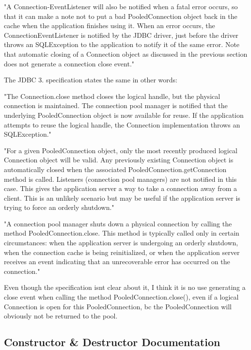"A Connection-\/\+Event\+Listener will also be notified when a fatal error occurs, so that it can make a note not to put a bad Pooled\+Connection object back in the cache when the application finishes using it. When an error occurs, the Connection\+Event\+Listener is notified by the J\+D\+BC driver, just before the driver throws an S\+Q\+L\+Exception to the application to notify it of the same error. Note that automatic closing of a Connection object as discussed in the previous section does not generate a connection close event." 

The J\+D\+BC 3. specification states the same in other words\+:

"The Connection.\+close method closes the logical handle, but the physical connection is maintained. The connection pool manager is notified that the underlying Pooled\+Connection object is now available for reuse. If the application attempts to reuse the logical handle, the Connection implementation throws an S\+Q\+L\+Exception." 

"For a given Pooled\+Connection object, only the most recently produced logical Connection object will be valid. Any previously existing Connection object is automatically closed when the associated Pooled\+Connection.\+get\+Connection method is called. Listeners (connection pool managers) are not notified in this case. This gives the application server a way to take a connection away from a client. This is an unlikely scenario but may be useful if the application server is trying to force an orderly shutdown." 

"A connection pool manager shuts down a physical connection by calling the method Pooled\+Connection.\+close. This method is typically called only in certain circumstances\+: when the application server is undergoing an orderly shutdown, when the connection cache is being reinitialized, or when the application server receives an event indicating that an unrecoverable error has occurred on the connection." 

Even though the specification isn\textquotesingle{}t clear about it, I think it is no use generating a close event when calling the method Pooled\+Connection.\+close(), even if a logical Connection is open for this Pooled\+Connection, bc the Pooled\+Connection will obviously not be returned to the pool. 

\subsection{Constructor \& Destructor Documentation}
\mbox{\label{classtestsuite_1_1regression_1_1_pooled_connection_regression_test_a1be54941bd00006c4127b4eac74ea7e5}} 
